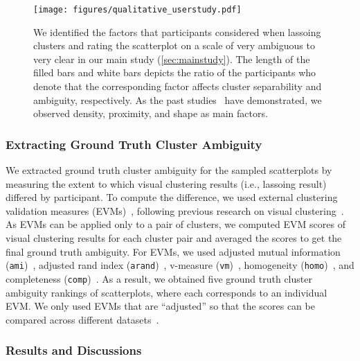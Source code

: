 \begin{figure}[t]
    \centering
    \texttt{[image: figures/qualitative\_userstudy.pdf]} \vspace{-6mm}
    \caption{We identified the factors that participants considered when lassoing clusters and rating the scatterplot on a scale of very ambiguous to very clear in our main study (\autoref{sec:mainstudy}). 
    The length of the filled bars and white bars depicts the ratio of the participants who denote that the corresponding factor affects cluster separability and ambiguity, respectively.
    As the past studies~\cite{sedlmair2012taxonomy, sadahiro1997cluster} have demonstrated, we observed density, proximity, and shape as main factors.}
    \label{fig:qual_study}
\end{figure}


\subsubsection{Extracting Ground Truth Cluster Ambiguity} 

\label{sec:groundtruthextract}

We extracted ground truth cluster ambiguity for the sampled scatterplots by measuring the extent to which visual clustering results (i.e., lassoing result) differed by participant.
To compute the difference, we used external clustering validation measures (EVMs)~\cite{wu09kdd}, following previous research on visual clustering~\cite{desjardins07iui, jeon22arxivdistortion}. As EVMs can be applied only to a pair of clusters, we computed EVM scores of visual clustering results for each cluster pair and averaged the scores to get the final ground truth ambiguity. For EVMs, we used adjusted mutual information (\texttt{ami})~\cite{vinh10jmlr}, adjusted rand index (\texttt{arand})~\cite{steinley04pm}, v-measure (\texttt{vm})~\cite{rosenberg07emnlp}, homogeneity (\texttt{homo})~\cite{rosenberg07emnlp}, and completeness (\texttt{comp})~\cite{rosenberg07emnlp}.
As a result, we obtained five ground truth cluster ambiguity rankings of scatterplots, where each corresponds to an individual EVM.
We only used EVMs that are ``adjusted'' so that the scores can be compared across different datasets~\cite{wu09kdd}.





\subsubsection{Results and Discussions} 

